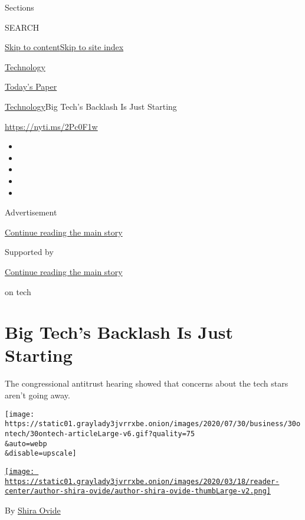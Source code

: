Sections

SEARCH

\protect\hyperlink{site-content}{Skip to
content}\protect\hyperlink{site-index}{Skip to site index}

\href{https://www.nytimes3xbfgragh.onion/section/technology}{Technology}

\href{https://myaccount.nytimes3xbfgragh.onion/auth/login?response_type=cookie\&client_id=vi}{}

\href{https://www.nytimes3xbfgragh.onion/section/todayspaper}{Today's
Paper}

\href{/section/technology}{Technology}\textbar{}Big Tech's Backlash Is
Just Starting

\href{https://nyti.ms/2Pc0F1w}{https://nyti.ms/2Pc0F1w}

\begin{itemize}
\item
\item
\item
\item
\item
\end{itemize}

Advertisement

\protect\hyperlink{after-top}{Continue reading the main story}

Supported by

\protect\hyperlink{after-sponsor}{Continue reading the main story}

on tech

\hypertarget{big-techs-backlash-is-just-starting}{%
\section{Big Tech's Backlash Is Just
Starting}\label{big-techs-backlash-is-just-starting}}

The congressional antitrust hearing showed that concerns about the tech
stars aren't going away.

\texttt{[image: https://static01.graylady3jvrrxbe.onion/images/2020/07/30/business/30ontech/30ontech-articleLarge-v6.gif?quality=75\\\&auto=webp\\\&disable=upscale]}

\href{https://www.nytimes3xbfgragh.onion/by/shira-ovide}{\texttt{[image: https://static01.graylady3jvrrxbe.onion/images/2020/03/18/reader-center/author-shira-ovide/author-shira-ovide-thumbLarge-v2.png]}}

By \href{https://www.nytimes3xbfgragh.onion/by/shira-ovide}{Shira Ovide}

